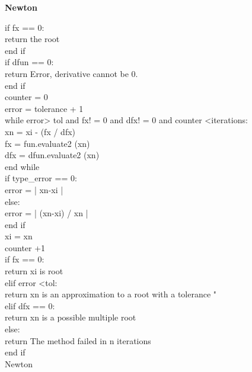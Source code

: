 \documentclass[letterpaper,12pt]{article}
\begin{document}
\textbf{Newton}
\IncMargin{1em}
\begin{algorithm}
\BlankLine
if fx == 0:\\
             return the root\\
     end if\\
         if dfun == 0:\\
             return Error, derivative cannot be 0.\\
     end if\\
     counter = 0\\
     error = tolerance + 1\\

         while error> tol and fx! = 0 and dfx! = 0 and counter <iterations:\\
             xn = xi - (fx / dfx)\\
             fx = fun.evaluate2 (xn)\\
             dfx = dfun.evaluate2 (xn)\\
         end while\\
         if type_error == 0:\\
                 error = | xn-xi |\\
             else:\\
                 error = | (xn-xi) / xn |\\
         end if\\
         xi = xn\\
         counter +1\\
         if fx == 0:\\
             return xi is root\\
         elif error <tol:\\
             return xn is an approximation to a root with a tolerance "\\
         elif dfx == 0:\\
             return xn is a possible multiple root\\
         else:\\
             return The method failed in n iterations\\
         end if\\
\caption{Newton}
\end{algorithm}\DecMargin{1em}
\end{document}
